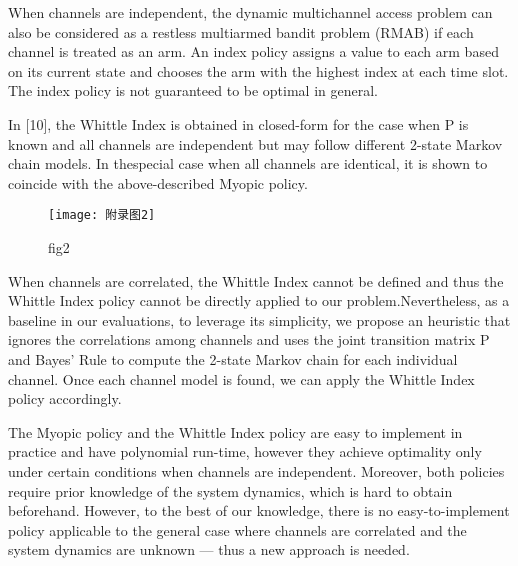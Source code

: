 When channels are independent, the dynamic multichannel access problem can also be considered as a restless multiarmed bandit problem (RMAB) if each channel is treated as an arm. An index policy assigns a value to each arm based on its current state and chooses the arm with the highest index at each time slot. The index policy is not guaranteed to be optimal in general. 

In [10], the Whittle Index is obtained in closed-form for the case when P is known and all channels are independent but may follow different 2-state Markov chain models. In thespecial case when all channels are identical, it is shown to coincide with the above-described Myopic policy.
\begin{figure}[h]
	\centering
	\texttt{[image: 附录图2]}
	\caption{fig2}
\end{figure}
When channels are correlated, the Whittle Index cannot be deﬁned and thus the Whittle Index policy cannot be directly applied to our problem.Nevertheless, as a baseline in our evaluations, to leverage its simplicity, we propose an heuristic that ignores the correlations among channels and uses the joint transition matrix P and Bayes’ Rule to compute the 2-state Markov chain for each individual channel. Once each channel model is found, we can apply the Whittle Index policy accordingly. 

The Myopic policy and the Whittle Index policy are easy to implement in practice and have polynomial run-time, however they achieve optimality only under certain conditions when channels are independent. Moreover, both policies require prior knowledge of the system dynamics, which is hard to obtain beforehand. However, to the best of our knowledge, there is no easy-to-implement policy applicable to the general case where channels are correlated and the system dynamics are unknown — thus a new approach is needed.


